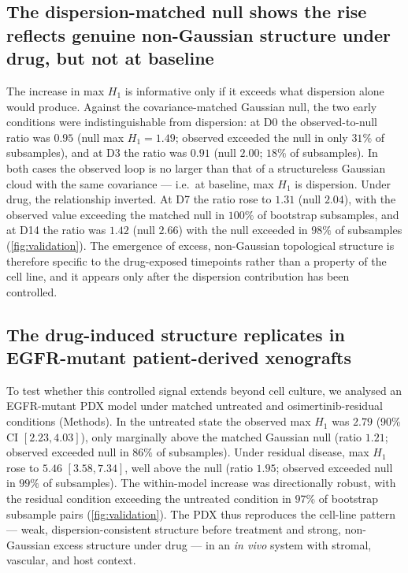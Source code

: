 \subsection*{The dispersion-matched null shows the rise reflects genuine
non-Gaussian structure under drug, but not at baseline}

The increase in max $H_1$ is informative only if it exceeds what
dispersion alone would produce. Against the covariance-matched Gaussian
null, the two early conditions were indistinguishable from dispersion:
at D0 the observed-to-null ratio was $0.95$ (null max $H_1 = 1.49$;
observed exceeded the null in only $31\%$ of subsamples), and at D3 the
ratio was $0.91$ (null $2.00$; $18\%$ of subsamples). In both cases the
observed loop is no larger than that of a structureless Gaussian cloud
with the same covariance --- i.e.\ at baseline, max $H_1$ is dispersion.
Under drug, the relationship inverted. At D7 the ratio rose to $1.31$
(null $2.04$), with the observed value exceeding the matched null in
$100\%$ of bootstrap subsamples, and at D14 the ratio was $1.42$
(null $2.66$) with the null exceeded in $98\%$ of subsamples
(\cref{fig:validation}). The emergence of excess, non-Gaussian
topological structure is therefore specific to the drug-exposed
timepoints rather than a property of the cell line, and it appears only
after the dispersion contribution has been controlled.

\subsection*{The drug-induced structure replicates in EGFR-mutant
patient-derived xenografts}

To test whether this controlled signal extends beyond cell culture, we
analysed an EGFR-mutant PDX model under matched untreated and
osimertinib-residual conditions (Methods). In the untreated state the
observed max $H_1$ was $2.79$ (90\% CI $[2.23, 4.03]$), only marginally
above the matched Gaussian null (ratio $1.21$; observed exceeded null in
$86\%$ of subsamples). Under residual disease, max $H_1$ rose to $5.46$
$[3.58, 7.34]$, well above the null (ratio $1.95$; observed exceeded null
in $99\%$ of subsamples). The within-model increase was directionally
robust, with the residual condition exceeding the untreated condition in
$97\%$ of bootstrap subsample pairs (\cref{fig:validation}). The PDX thus
reproduces the cell-line pattern --- weak, dispersion-consistent
structure before treatment and strong, non-Gaussian excess structure
under drug --- in an \emph{in vivo} system with stromal, vascular, and
host context.

